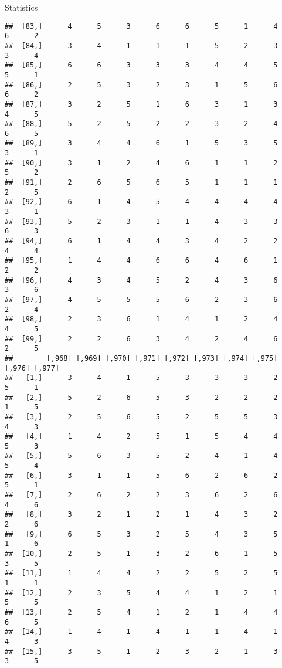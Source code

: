 \documentclass[
  ignorenonframetext,
]{beamer}
\begin{document}
\begin{frame}[fragile]{Statistics}
\begin{verbatim}
##  [83,]      4      5      3      6      6      5      1      4      6      2
##  [84,]      3      4      1      1      1      5      2      3      3      4
##  [85,]      6      6      3      3      3      4      4      5      5      1
##  [86,]      2      5      3      2      3      1      5      6      6      2
##  [87,]      3      2      5      1      6      3      1      3      4      5
##  [88,]      5      2      5      2      2      3      2      4      6      5
##  [89,]      3      4      4      6      1      5      3      5      3      1
##  [90,]      3      1      2      4      6      1      1      2      5      2
##  [91,]      2      6      5      6      5      1      1      1      2      5
##  [92,]      6      1      4      5      4      4      4      4      3      1
##  [93,]      5      2      3      1      1      4      3      3      6      3
##  [94,]      6      1      4      4      3      4      2      2      4      4
##  [95,]      1      4      4      6      6      4      6      1      2      2
##  [96,]      4      3      4      5      2      4      3      6      3      6
##  [97,]      4      5      5      5      6      2      3      6      2      4
##  [98,]      2      3      6      1      4      1      2      4      4      5
##  [99,]      2      2      6      3      4      2      4      6      2      5
##        [,968] [,969] [,970] [,971] [,972] [,973] [,974] [,975] [,976] [,977]
##   [1,]      3      4      1      5      3      3      3      2      5      1
##   [2,]      5      2      6      5      3      2      2      2      1      5
##   [3,]      2      5      6      5      2      5      5      3      4      3
##   [4,]      1      4      2      5      1      5      4      4      5      3
##   [5,]      5      6      3      5      2      4      1      4      5      4
##   [6,]      3      1      1      5      6      2      6      2      5      1
##   [7,]      2      6      2      2      3      6      2      6      4      6
##   [8,]      3      2      1      2      1      4      3      2      2      6
##   [9,]      6      5      3      2      5      4      3      5      1      6
##  [10,]      2      5      1      3      2      6      1      5      3      5
##  [11,]      1      4      4      2      2      5      2      5      1      1
##  [12,]      2      3      5      4      4      1      2      1      5      5
##  [13,]      2      5      4      1      2      1      4      4      6      5
##  [14,]      1      4      1      4      1      1      4      1      4      3
##  [15,]      3      5      1      2      3      2      1      3      3      5

\end{verbatim}
\end{frame}
\end{document}
